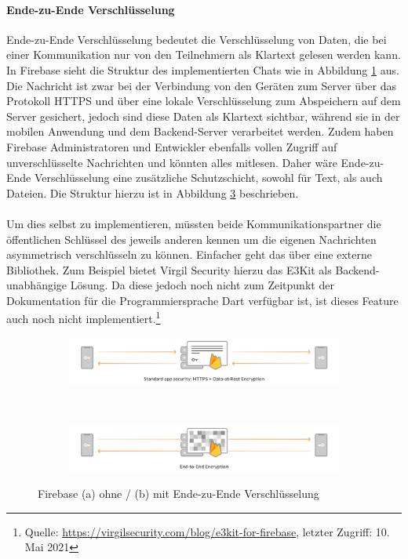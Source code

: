 \paragraph{Ende-zu-Ende Verschlüsselung}
Ende-zu-Ende Verschlüsselung bedeutet die Verschlüsselung von Daten, die bei einer Kommunikation nur von den Teilnehmern als Klartext gelesen werden kann.
In Firebase sieht die Struktur des implementierten Chats wie in Abbildung \ref{fig:firebase_without_encryption} aus.
Die Nachricht ist zwar bei der Verbindung von den Geräten zum Server über das Protokoll HTTPS und über eine lokale Verschlüsselung zum Abspeichern auf dem Server gesichert, jedoch sind diese Daten als Klartext sichtbar, während sie in der mobilen Anwendung und dem Backend-Server verarbeitet werden.
Zudem haben Firebase Administratoren und Entwickler ebenfalls vollen Zugriff auf unverschlüsselte Nachrichten und könnten alles mitlesen.
Daher wäre Ende-zu-Ende Verschlüsselung eine zusätzliche Schutzschicht, sowohl für Text, als auch Dateien.
Die Struktur hierzu ist in Abbildung \ref{fig:firebase_with_encryption} beschrieben.\\
\\
Um dies selbst zu implementieren, müssten beide Kommunikationspartner die öffentlichen Schlüssel des jeweils anderen kennen um die eigenen Nachrichten asymmetrisch verschlüsseln zu können.
Einfacher geht das über eine externe Bibliothek.
Zum Beispiel bietet Virgil Security hierzu das E3Kit als Backend-unabhängige Lösung.
Da diese jedoch noch nicht zum Zeitpunkt der Dokumentation für die Programmiersprache Dart verfügbar ist, ist dieses Feature auch noch nicht implementiert.\footnote{Quelle: \url{https://virgilsecurity.com/blog/e3kit-for-firebase}, letzter Zugriff: 10. Mai 2021}
\begin{figure}[tbt]
	\begin{subfigure}{\textwidth}
		\centering
		\includegraphics[width=15cm]{Backend_Implementierung/images/firebase_without_p2p_encryption.png}
		\caption{}
		\label{fig:firebase_without_encryption}
	\end{subfigure}\\
	\begin{subfigure}{\textwidth}
		\centering
		\includegraphics[width=15cm]{Backend_Implementierung/images/firebase_with_p2p_encryption.png}
		\caption{}
		\label{fig:firebase_with_encryption}
	\end{subfigure}
	\caption[]{ Firebase (a) ohne / (b) mit Ende-zu-Ende Verschlüsselung \protect \footnotemark}
\end{figure}
